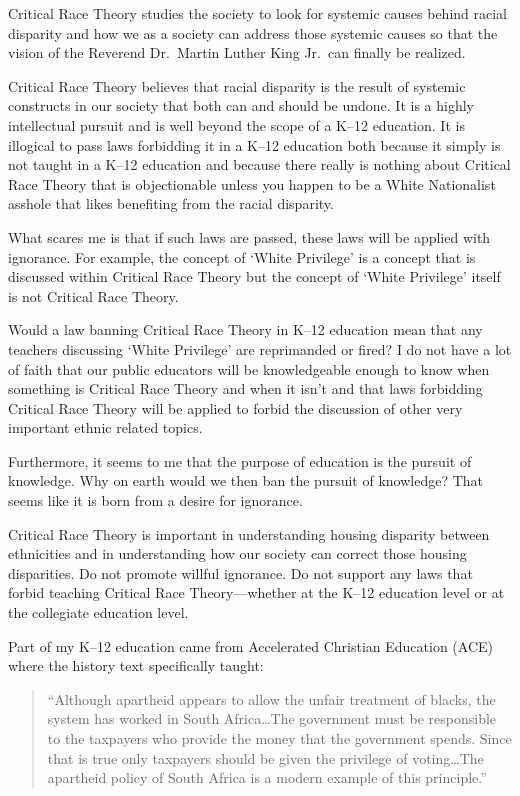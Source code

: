 Critical Race Theory studies the society to look for systemic causes behind racial disparity and how we as a society can address those systemic causes so that the vision of the
Reverend Dr.\ Martin Luther King Jr.\ can finally be realized.

Critical Race Theory believes that racial disparity is the result of systemic constructs in our society that both can and should be undone. It is a highly intellectual pursuit and is well beyond the scope of a K--12 education. It is illogical to pass laws forbidding it in a K--12 education both because it simply is not taught in a K--12 education and because there really is nothing about Critical Race Theory that is objectionable unless you happen to be a White Nationalist asshole that likes benefiting from the racial disparity.

What scares me is that if such laws are passed, these laws will be applied with ignorance. For example, the concept of `White Privilege' is a concept that is discussed within Critical Race Theory but the concept of `White Privilege' itself is not Critical Race Theory.

Would a law banning Critical Race Theory in K--12 education mean that any teachers discussing `White Privilege' are reprimanded or fired? I do not have a lot of faith that our public educators will be knowledgeable enough to know when something is Critical Race Theory and when it isn't and that laws forbidding Critical Race Theory will be applied to forbid the discussion of other very important ethnic related topics.

Furthermore, it seems to me that the purpose of education is the pursuit of knowledge. Why on earth would we then ban the pursuit of knowledge? That seems like it is born from a desire for ignorance.

Critical Race Theory is important in understanding housing disparity between ethnicities and in understanding how our society can correct those housing disparities. Do not promote willful ignorance. Do not support any laws that forbid teaching Critical Race Theory---whether at the K--12 education level or at the collegiate education level.

Part of my K--12 education came from Accelerated Christian Education (ACE) where the history text specifically taught:

\begin{quote}
``Although apartheid appears to allow the unfair treatment of blacks, the system has worked in South Africa\ldots{}The government must be responsible to the taxpayers who provide the money that the government spends. Since that is true only taxpayers should be given the privilege of voting\ldots{}The apartheid policy of South Africa is a modern example of this principle.''
\end{quote}

